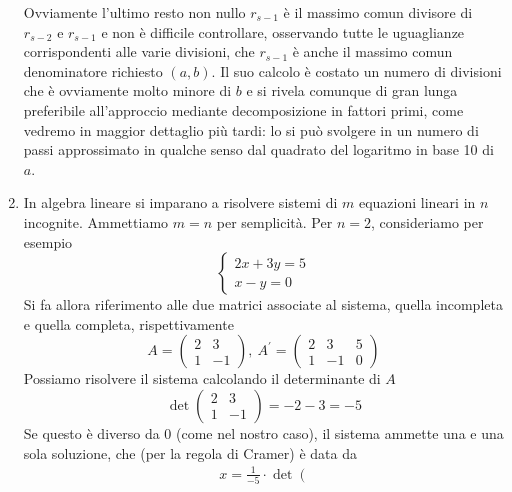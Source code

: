 \begin{enumerate}
          Ovviamente l'ultimo resto non nullo $r_{s-1}$ è il massimo comun
          divisore di $r_{s-2}$ e $r_{s-1}$ e non è difficile controllare, osservando
          tutte le uguaglianze corrispondenti alle varie divisioni, che $r_{s-1}$ è anche
          il massimo comun denominatore richiesto $(a, b)$. Il suo calcolo è costato un
          numero di divisioni che è ovviamente molto minore di $b$ e si rivela comunque di
          gran lunga preferibile all'approccio mediante decomposizione in fattori primi,
          come vedremo in maggior dettaglio più tardi: lo si può svolgere in un numero di
          passi approssimato in qualche senso dal quadrato del logaritmo in base 10 di
          $a$.
    \item In algebra lineare si imparano a risolvere sistemi di $m$ equazioni
          lineari in $n$ incognite. Ammettiamo $m=n$ per semplicità. Per $n=2$,
          consideriamo per esempio
          $$
              \left\{\begin{array}{l}
                  2 x+3 y=5 \\
                  x-y=0
              \end{array}\right.
          $$
          Si fa allora riferimento alle due matrici associate al sistema, quella
          incompleta e quella completa, rispettivamente
          $$
              A=\left(\begin{array}{cc}
                      2 & 3  \\
                      1 & -1
                  \end{array}\right), \ A^{\prime}=\left(\begin{array}{ccc}
                      2 & 3  & 5 \\
                      1 & -1 & 0
                  \end{array}\right)
          $$
          Possiamo risolvere il sistema calcolando il determinante di $A$
          $$
              \operatorname{det}\left(\begin{array}{cc}
                      2 & 3  \\
                      1 & -1
                  \end{array}\right)=-2-3=-5
          $$
          Se questo è diverso da 0 (come nel nostro caso), il sistema ammette una e una
          sola soluzione, che (per la regola di Cramer) è data da
          $$
              \begin{aligned}
                   & x=\frac{1}{-5} \cdot \operatorname{det}\left(\begin{array}{cc}

\end{array}
\end{aligned}$$
\end{enumerate}
